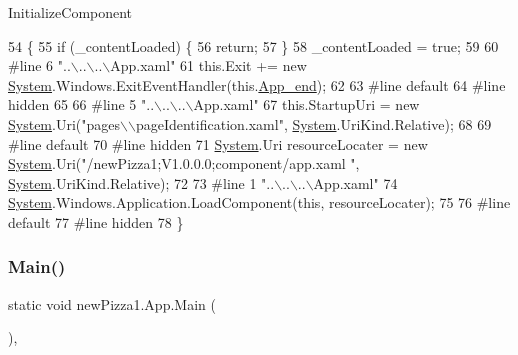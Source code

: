Initialize\+Component 


\begin{DoxyCode}
54                                           \{
55             \textcolor{keywordflow}{if} (\_contentLoaded) \{
56                 \textcolor{keywordflow}{return};
57             \}
58             \_contentLoaded = \textcolor{keyword}{true};
59             
60 \textcolor{preprocessor}{            #line 6 "..\(\backslash\)..\(\backslash\)..\(\backslash\)App.xaml"}
61             this.Exit += \textcolor{keyword}{new} \hyperlink{namespaceSystem}{System}.Windows.ExitEventHandler(this.\hyperlink{classnewPizza1_1_1App_adb889537b1e18b9309daa743947fd0db}{App\_end});
62             
63 \textcolor{preprocessor}{            #line default}
64 \textcolor{preprocessor}{            #line hidden}
65             
66 \textcolor{preprocessor}{            #line 5 "..\(\backslash\)..\(\backslash\)..\(\backslash\)App.xaml"}
67             this.StartupUri = \textcolor{keyword}{new} \hyperlink{namespaceSystem}{System}.Uri(\textcolor{stringliteral}{"pages\(\backslash\)\(\backslash\)pageIdentification.xaml"}, 
      \hyperlink{namespaceSystem}{System}.UriKind.Relative);
68             
69 \textcolor{preprocessor}{            #line default}
70 \textcolor{preprocessor}{            #line hidden}
71             \hyperlink{namespaceSystem}{System}.Uri resourceLocater = \textcolor{keyword}{new} \hyperlink{namespaceSystem}{System}.Uri(\textcolor{stringliteral}{"/newPizza1;V1.0.0.0;component/app.xaml
      "}, \hyperlink{namespaceSystem}{System}.UriKind.Relative);
72             
73 \textcolor{preprocessor}{            #line 1 "..\(\backslash\)..\(\backslash\)..\(\backslash\)App.xaml"}
74             \hyperlink{namespaceSystem}{System}.Windows.Application.LoadComponent(\textcolor{keyword}{this}, resourceLocater);
75             
76 \textcolor{preprocessor}{            #line default}
77 \textcolor{preprocessor}{            #line hidden}
78         \}
\end{DoxyCode}
\mbox{\label{classnewPizza1_1_1App_ab05f0e942749365a0b09024da23f09c4}} 
\subsubsection{\texorpdfstring{Main()}{Main()}\hspace{0.1cm}{\footnotesize\ttfamily [1/2]}}
{\footnotesize\ttfamily static void new\+Pizza1.\+App.\+Main (\begin{DoxyParamCaption}{ }\end{DoxyParamCaption})\hspace{0.3cm}{\ttfamily [inline]}, {\ttfamily [static]}}



